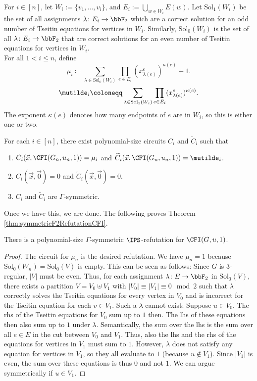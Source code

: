\documentclass[a4paper,UKenglish,cleveref, autoref, thm-restate]{lipics-v2021}
\begin{document}
For $i \in [n]$, let $W_i := \{v_1,...,v_i\}$, and $E_i := \bigcup_{w \in W_i} E(w)$. Let $\text{Sol}_1(W_i)$ be the set of all assignments $\lambda \colon E_i \to \bbF_2$ which are a correct solution for an odd number of Tseitin equations for vertices in $W_i$. Similarly, $\text{Sol}_0(W_i)$ is the set of all $\lambda \colon E_i \to \bbF_2$ that are correct solutions for an even number of Tseitin equations for vertices in $W_i$.\\
For all $1 < i \leq n$, define
\[
\mu_i \coloneqq  \sum_{\lambda \in \text{Sol}_0(W_i)} \prod_{e \in E_i} (x_{\lambda(e)}^{e} )^{\kappa(e)} + 1.
\]
\[
\mutilde_i \coloneqq \sum_{\lambda \in \text{Sol}_1(W_i)} \prod_{e \in E_i} (x_{\lambda(e)}^{e})^{\kappa(e)}.
\]
The exponent $\kappa(e)$ denotes how many endpoints of $e$ are in $W_i$, so this is either one or two.
\begin{lemma}
	\label{lem:computingMu}
	For each $i \in [n]$, there exist polynomial-size circuits $C_i$ and $\widetilde{C}_i$ such that 
	\begin{enumerate}
		\item $C_i(\vec x, \CFI(G_n, u_n, 1)) = \mu_i$ and $\widetilde{C}_i(\vec x, \CFI(G_n, u_n, 1)) = \mutilde_i$. 
		\item $C_i(\vec x, \vec 0) = 0$ and $\widetilde{C}_i(\vec x, \vec 0) = 0$.
		\item $C_i$ and $\widetilde{C}_i$ are $\Gamma$-symmetric.
	\end{enumerate}	
\end{lemma}

Once we have this, we are done. The following proves Theorem \ref{thm:symmetricF2RefutationCFI}.
\begin{corollary}
	\label{cor:symRefutationCFI}
	There is a polynomial-size $\Gamma$-symmetric $\IPS$-refutation for $\CFI(G, u, 1)$.
\end{corollary}
\begin{proof}
	The circuit for $\mu_n$ is the desired refutation.
	We have $\mu_n = 1$ because $\text{Sol}_0(W_n) = \text{Sol}_0(V)$ is empty. This can be seen as follows: Since $G$ is $3$-regular, $|V|$ must be even. Thus, for each assignment $\lambda\colon E \to \bbF_2$ in $\text{Sol}_0(V)$, there exists a partition $V = V_0 \uplus V_1$ with $|V_0| \equiv |V_1| \equiv 0 \mod 2$ such that $\lambda$ correctly solves the Tseitin equations for every vertex in $V_0$ and is incorrect for the Tseitin equation for each $v \in V_1$. 
	Such a $\lambda$ cannot exist: Suppose $u \in V_0$. The rhs of the Tseitin equations for $V_0$ sum up to $1$ then. The lhs of these equations then also sum up to $1$ under $\lambda$. Semantically, the sum over the lhs is the sum over all $e \in E$ in the cut between $V_0$ and $V_1$. Thus, also the lhs and the rhs of the equations for vertices in $V_1$ must sum to $1$. However, $\lambda$ does not satisfy any equation for vertices in $V_1$, so they all evaluate to $1$ (because $u \notin V_1$). Since $|V_1|$ is even, the sum over these equations is thus $0$ and not $1$. We can argue symmetrically if $u \in V_1$. 
\end{proof}	
\end{document}
